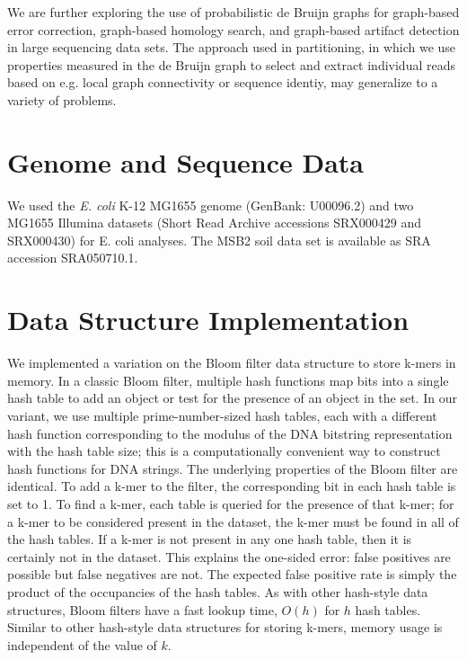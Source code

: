 \documentclass[draft]{pnastwo}
\begin{document}
\begin{article}
We are further exploring the use of probabilistic de Bruijn graphs for
graph-based error correction, graph-based homology search, and
graph-based artifact detection in large sequencing data sets.  The
approach used in partitioning, in which we use properties measured
in the de Bruijn graph to select and extract individual reads based
on e.g. local graph connectivity or sequence identiy, may generalize
to a variety of problems.

\begin{materials}

\section{Genome and Sequence Data}
We used the \emph{E. coli} K-12 MG1655 genome (GenBank: U00096.2) and
two MG1655 Illumina datasets (Short Read Archive accessions SRX000429
and SRX000430) for E. coli analyses.  The MSB2 soil data set is
available as SRA accession SRA050710.1.

\section{Data Structure Implementation}
We implemented a variation on the Bloom filter data structure to store
k-mers in memory. In a classic Bloom filter, multiple hash functions
map bits into a single hash table to add an object or test for the
presence of an object in the set. In our variant, we use multiple
prime-number-sized hash tables, each with a different hash function
corresponding to the modulus of the DNA bitstring representation with
the hash table size; this is a computationally convenient way to
construct hash functions for DNA strings.  The underlying properties
of the Bloom filter are identical.  To add a k-mer to the filter, the
corresponding bit in each hash table is set to 1.  To find a k-mer,
each table is queried for the presence of that k-mer; for a k-mer to
be considered present in the dataset, the k-mer must be found in all
of the hash tables.  If a k-mer is not present in any one hash table,
then it is certainly not in the dataset. This explains the one-sided
error: false positives are possible but false negatives are not. The
expected false positive rate is simply the product of the occupancies
of the hash tables.  As with other hash-style data structures, Bloom
filters have a fast lookup time, $O(h)$ for $h$ hash tables.  Similar
to other hash-style data structures for storing k-mers, memory usage
is independent of the value of $k$.


\end{materials}
\end{article}
\end{document}
